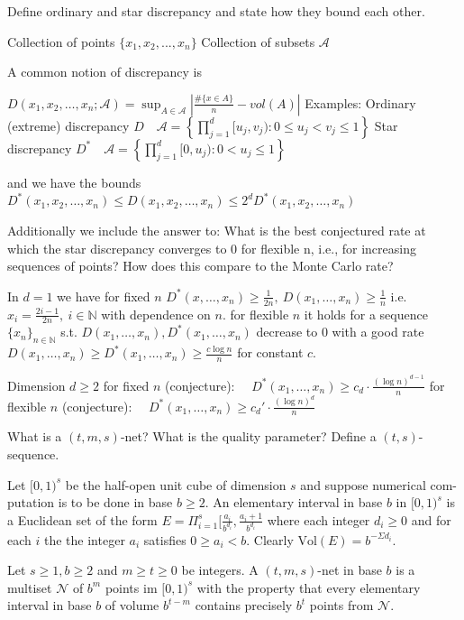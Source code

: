 Define ordinary and star discrepancy and state how they bound each other.

Collection of points \( \{x_1, x_2, ..., x_n\} \)
Collection of subsets \( \mathcal{A} \)

A common notion of discrepancy is

\( D(x_1, x_2, \dots, x_n; \mathcal{A}) = \sup_{A \in \mathcal{A}} \left| \frac{\# \{x \in A\}}{n} - vol(A) \right| \)
Examples:
Ordinary (extreme) discrepancy \( D \quad \mathcal{A} = \left\{ \prod_{j=1}^d [u_j, v_j) : 0 \le u_j < v_j \le 1 \right\} \)
Star discrepancy \( D^\ast \quad \mathcal{A} = \left\{ \prod_{j=1}^d [0, u_j) : 0 < u_j \le 1 \right\} \)

and we have the bounds
\( D^\ast(x_1, x_2, \dots, x_n) \leq D(x_1, x_2, \dots, x_n) \leq 2^d D^\ast(x_1, x_2, \dots, x_n) \)

Additionally we include the answer to:
What is the best conjectured rate at which the star discrepancy converges to 0 for
flexible n, i.e., for increasing sequences of points? How does this compare to the
Monte Carlo rate?

In \( d = 1 \) we have for fixed \( n \) 
\( D^\ast(x,\dots,x_n) \geq \frac{1}{2n},\ D(x_1, \dots, x_n) \geq \frac{1}{n} \)
i.e. \( x_i = \frac{2i - 1}{2n},\ i \in \mathbb{N} \) with dependence on \( n \).
for flexible \( n \) it holds for a sequence \( \{x_n\}_{n \in \mathbb{N}}\) s.t. \( D(x_1, \dots, x_n), D^\ast(x_1, \dots, x_n) \)
decrease to \( 0 \) with a good rate \(D(x_1, \dots, x_n) \geq D^\ast(x_1, \dots, x_n) \geq \frac{c\log{n}}{n}\)
for constant \( c \).

Dimension \( d \geq 2\)
for fixed \( n \) (conjecture): \( \quad D^\ast(x_1, \dots, x_n) \ge c_d \cdot \frac{(\log n)^{d-1}}{n} \)
for flexible \( n \) (conjecture): \( \quad D^\ast(x_1, \dots, x_n) \ge c_d' \cdot \frac{(\log n)^d}{n} \) 


What is a \( (t, m, s) \)-net? What is the quality parameter? Define a \( (t, s) \)-sequence.

Let \( [0, 1)^{s} \) be the half-open unit cube of dimension \( s \) and suppose numerical com-
putation is to be done in base \( b \geq 2 \). An elementary interval in base \( b \) in \( [0, 1)^{s} \) is
a Euclidean set of the form
\( E = \Pi^s_{i=1} [\frac{a_i}{b^{d_i}}, \frac{a_i + 1}{b^{d_i}} \)
where each integer \( d_i \geq 0 \) and for each \( i \) the 
the integer \( a_i \) satisfies \( 0 \geq a_i < b \).
Clearly \( \text{Vol}(E) = b^{-\Sigma d_i} \).

Let \( s \geq 1, b \geq 2 \) and \( m \geq t \geq 0 \) be integers. A \( (t, m, s) \)-net in base \( b \)
is a multiset \( \mathcal{N} \) of \( b^m \) points im \( [0, 1)^s \) with the property that every elementary 
interval in base \( b \) of volume \( b^{t-m} \) contains precisely \( b^t \) points from \( \mathcal{N} \).

